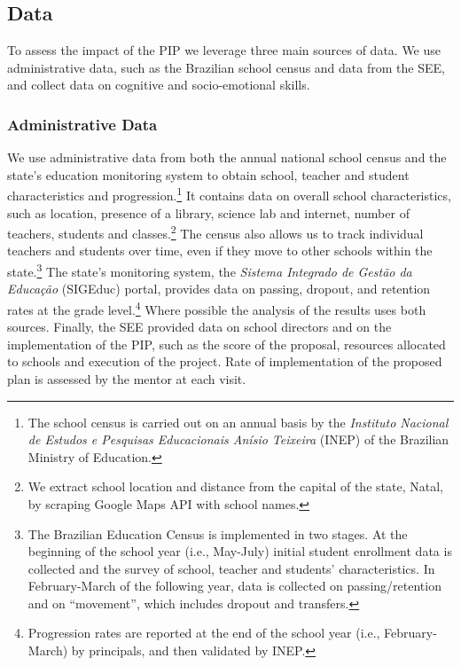 \documentclass[11pt,a4paper]{article}
\begin{document}
\subsection{Data} \label{sec:data}

To assess the impact of the PIP we leverage three main sources of data. We use administrative data, such as the Brazilian school census and data from the SEE, and collect data on cognitive and socio-emotional skills.

\subsubsection*{Administrative Data} 
We use administrative data from both the annual national school census and the state's education monitoring system to obtain school, teacher and student characteristics and progression.\footnote{The school census is carried out on an annual basis by the \textit{Instituto Nacional de Estudos e Pesquisas Educacionais Anísio Teixeira} (INEP) of the Brazilian Ministry of Education.} It contains data on overall school characteristics, such as location, presence of a library, science lab and internet, number of teachers, students and classes.\footnote{We extract school location and distance from the capital of the state, Natal, by scraping Google Maps API with school names.} The census also allows us to track individual teachers and students over time, even if they move to other schools within the state.\footnote{The Brazilian Education Census is implemented in two stages. At the beginning of the school year (i.e., May-July) initial student enrollment data is collected and the survey of school, teacher and students' characteristics. In February-March of the following year, data is collected on passing/retention and on ``movement'', which includes dropout and transfers.} The state's monitoring system, the \textit{Sistema Integrado de Gestão da Educação} (SIGEduc) portal, provides data on passing, dropout, and retention rates at the grade level.\footnote{Progression rates are reported at the end of the school year (i.e., February-March) by principals, and then validated by INEP.} Where possible the analysis of the results uses both sources. Finally, the SEE provided data on school directors and on the implementation of the PIP, such as the score of the proposal, resources allocated to schools and execution of the project. Rate of implementation of the proposed plan is assessed by the mentor at each visit.  
\end{document}
